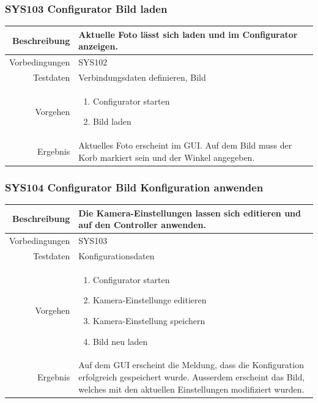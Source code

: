\subsubsection{SYS103 Configurator Bild laden }
\begin{table}[h!]
	\renewcommand{\arraystretch}{1.5}
	\begin{tabular}{|r|p{14cm}|}
		\hline Beschreibung & Aktuelle Foto lässt sich laden und im Configurator anzeigen. \\ 
		\hline Vorbedingungen & SYS102 \\ 
		\hline Testdaten & Verbindungsdaten definieren, Bild \\ 
		\hline Vorgehen & 
		\begin{enumerate}
			\item Configurator starten
			\item Bild laden
		\end{enumerate} \\ 
		\hline Ergebnis & Aktuelles Foto erscheint im GUI. Auf dem Bild muss der Korb markiert sein und der Winkel angegeben. \\ 
		\hline 
	\end{tabular}
\end{table}

\subsubsection{SYS104 Configurator Bild Konfiguration anwenden }
\begin{table}[h!]
	\renewcommand{\arraystretch}{1.5}
	\begin{tabular}{|r|p{14cm}|}
		\hline Beschreibung & Die Kamera-Einstellungen lassen sich editieren und auf den Controller anwenden. \\ 
		\hline Vorbedingungen & SYS103 \\ 
		\hline Testdaten & Konfigurationsdaten \\ 
		\hline Vorgehen & 
		\begin{enumerate}
			\item Configurator starten
			\item Kamera-Einstellunge editieren
			\item Kamera-Einstellung speichern
			\item Bild neu laden
		\end{enumerate} \\ 
		\hline Ergebnis & Auf dem GUI erscheint die Meldung, dass die Konfiguration erfolgreich gespeichert wurde.
		Ausserdem erscheint das Bild, welches mit den aktuellen Einstellungen modifiziert wurden. \\ 
		\hline 
	\end{tabular}
\end{table}

